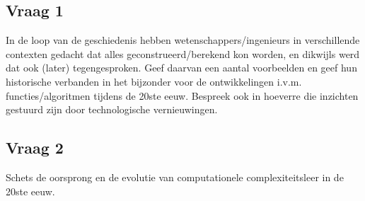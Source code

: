 \documentclass[../main.tex]{subfiles}
\begin{document}
\subsection{Vraag 1}
\begin{question}
	In de loop van de geschiedenis hebben wetenschappers/ingenieurs in verschillende
	contexten gedacht dat alles geconstrueerd/berekend kon worden, en dikwijls werd 
	dat ook (later) tegengesproken. Geef daarvan een aantal voorbeelden en geef hun 
	historische verbanden in het bijzonder voor de ontwikkelingen i.v.m. functies/algoritmen 
	tijdens de 20ste eeuw. Bespreek ook in hoeverre die inzichten gestuurd zijn door 
	technologische vernieuwingen.
\end{question}

\begin{solution}
	
\end{solution}


\subsection{Vraag 2}
\begin{question}
	Schets de oorsprong en de evolutie van computationele complexiteitsleer in de 20ste
	eeuw.
\end{question}

\begin{solution}
	
\end{solution}
\end{document}
